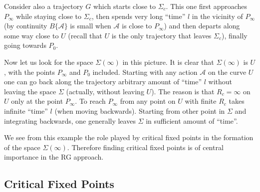 Consider also a trajectory $G$ which starts close to $\Sigma_c$. This one first
approaches $P_\infty$ while staying close to $\Sigma_c$, then spends very long
``time'' $l$ in the vicinity of $P_\infty$ (by continuity $B\{\mathcal A\}$ is
small when $\mathcal A$ is close to $P_\infty$) and then departs along some way
close to $U$ (recall that $U$ is the only trajectory that leaves $\Sigma_c$),
finally going towards $P_0$.

Now let us look for the space $\Sigma(\infty)$ in this picture. It is clear that
$\Sigma(\infty)$ is $U$, with the points $P_\infty$ and $P_0$ included. Starting
with any action $\mathcal A$ on the curve $U$ one can go back along the trajectory
arbitrary amount of ``time'' $l$ without leaving the space $\Sigma$ (actually,
without leaving $U$). The reason is that $R_c=\infty$ on $U$ only at the point
$P_\infty$. To reach $P_\infty$ from any point on $U$ with finite $R_c$ takes
infinite ``time'' $l$ (when moving backwards). Starting from other point in
$\Sigma$ and integrating backwards, one generally leaves $\Sigma$ in sufficient
amount of ``time''.

We see from this example the role played by critical fixed points in the
formation of the space $\Sigma(\infty)$. Therefore finding critical fixed points
is of central importance in the RG approach.

\subsection*{Critical Fixed Points}

